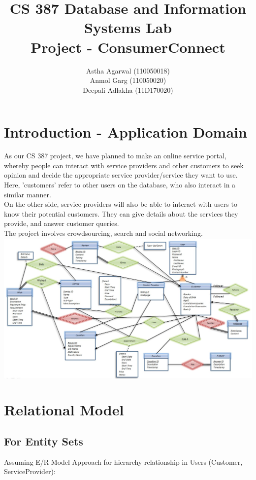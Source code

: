 \documentclass[a4paper]{article}
\title{CS 387 Database and Information Systems Lab\\
Project - ConsumerConnect}
\author{
Astha Agarwal (110050018)\\
Anmol Garg (110050020)\\
Deepali Adlakha (11D170020)}
\begin{document}
\maketitle


\section{Introduction - Application Domain}


As our CS 387 project, we have planned to make an online service portal, whereby people can interact with service providers and other customers to seek opinion and decide the appropriate service provider/service they want to use. Here, 'customers' refer to other users on the database, who also interact in a similar manner.\\On the other side, service providers will also be able to interact with users to know their potential customers. They can give details about the services they provide, and answer customer queries.\\The project involves crowdsourcing, search and social networking.\\


\includegraphics[width=160mm]{ermodel.jpg}



\section{Relational Model}


\subsection{For Entity Sets}
Assuming E/R Model Approach for hierarchy relationship in Users (Customer, ServiceProvider):
\end{document}
